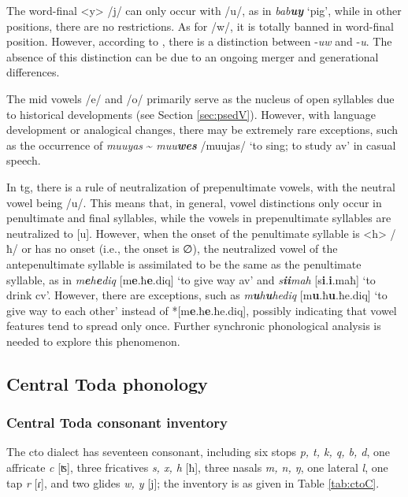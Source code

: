 The word-final <y> /j/ can only occur with /u/, as in \textit{bab\textbf{uy}} `pig', while in other positions, there are no restrictions. As for /w/, it is totally banned in word-final position. However, according to \textcite{yang1976sedpho}, there is a distinction between -\textit{uw} and -\textit{u}. The absence of this distinction can be due to an ongoing merger and generational differences.

The mid vowels /e/ and /o/ primarily serve as the nucleus of open syllables due to historical developments (see Section \ref{sec:psedV}). However, with language development or analogical changes, there may be extremely rare exceptions, such as the occurrence of \textit{muuyas} \~{} \textit{muu\textbf{wes}} /muujas/ `to sing; to study \acs{av}' in casual speech.

In \acl{tg}, there is a rule of neutralization of prepenultimate vowels, with the neutral vowel being /u/. This means that, in general, vowel distinctions only occur in penultimate and final syllables, while the vowels in prepenultimate syllables are neutralized to [u]. However, when the onset of the penultimate syllable is <h> /ħ/ or has no onset (i.e., the onset is ∅), the neutralized vowel of the antepenultimate syllable is assimilated to be the same as the penultimate syllable, as in \textit{m\textbf{e}h\textbf{e}diq} [m\textbf{e}.ħ\textbf{e}.diq] `to give way \acs{av}' and \textit{s\textbf{ii}mah} [s\textbf{i}.\textbf{i}.maħ] `to drink \acs{cv}'. However, there are exceptions, such as \textit{m\textbf{u}h\textbf{u}hediq} [m\textbf{u}.ħ\textbf{u}.ħe.diq] `to give way to each other' instead of *[m\textbf{e}.ħ\textbf{e}.ħe.diq], possibly indicating that vowel features tend to spread only once. Further synchronic phonological analysis is needed to explore this phenomenon.


\subsection{Central Toda phonology}

\subsubsection{Central Toda consonant inventory}

The \acl{cto} dialect has seventeen consonant, including six stops \textit{p, t, k, q, b, d}, one affricate \textit{c} [ʦ], three fricatives \textit{s, x, h} [ħ], three nasals \textit{m, n, ŋ}, one lateral \textit{l}, one tap \textit{r} [ɾ], and two glides \textit{w, y} [j]; the inventory is as given in Table \ref{tab:ctoC}.

